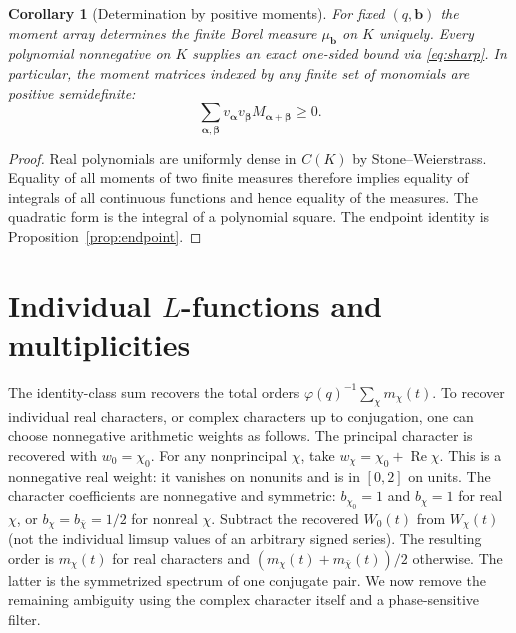 \documentclass[11pt]{article}
\newtheorem{corollary}[theorem]{Corollary}
\theoremstyle{remark}\newtheorem{remark}[theorem]{Remark}
\newcommand{\Rea}{\operatorname{Re}}\newcommand{\ord}{\operatorname{ord}}
\newcommand{\bfa}{\boldsymbol\alpha}
\newcommand{\bb}{\boldsymbol b}
\begin{document}
\begin{corollary}[Determination by positive moments]
For fixed $(q,\bb)$ the moment array determines the finite Borel measure $\mu_{\bb}$ on $K$ uniquely. Every polynomial nonnegative on $K$ supplies an exact one-sided bound via \eqref{eq:sharp}. In particular, the moment matrices indexed by any finite set of monomials are positive semidefinite:
\[
 \sum_{\bfa,\boldsymbol\beta}v_{\bfa}v_{\boldsymbol\beta}
 M_{\bfa+\boldsymbol\beta}\ge0.
\]
\end{corollary}
\begin{proof}
Real polynomials are uniformly dense in $C(K)$ by Stone--Weierstrass. Equality of all moments of two finite measures therefore implies equality of integrals of all continuous functions and hence equality of the measures. The quadratic form is the integral of a polynomial square. The endpoint identity is Proposition~\ref{prop:endpoint}.
\end{proof}

\section{Individual \texorpdfstring{$L$}{L}-functions and multiplicities}\label{sec:individual}
The identity-class sum recovers the total orders $\varphi(q)^{-1}\sum_\chi m_\chi(t)$. To recover individual real characters, or complex characters up to conjugation, one can choose nonnegative arithmetic weights as follows. The principal character is recovered with $w_0=\chi_0$. For any nonprincipal $\chi$, take $w_\chi=\chi_0+\Rea\chi$. This is a nonnegative real weight: it vanishes on nonunits and is in $[0,2]$ on units. The character coefficients are nonnegative and symmetric: $b_{\chi_0}=1$ and $b_\chi=1$ for real $\chi$, or $b_\chi=b_{\bar\chi}=1/2$ for nonreal $\chi$.
Subtract the recovered $W_0(t)$ from $W_\chi(t)$ (not the individual limsup values of an arbitrary signed series). The resulting order is $m_\chi(t)$ for real characters and $(m_\chi(t)+m_{\bar\chi}(t))/2$ otherwise. The latter is the symmetrized spectrum of one conjugate pair. We now remove the remaining ambiguity using the complex character itself and a phase-sensitive filter.
\end{document}
